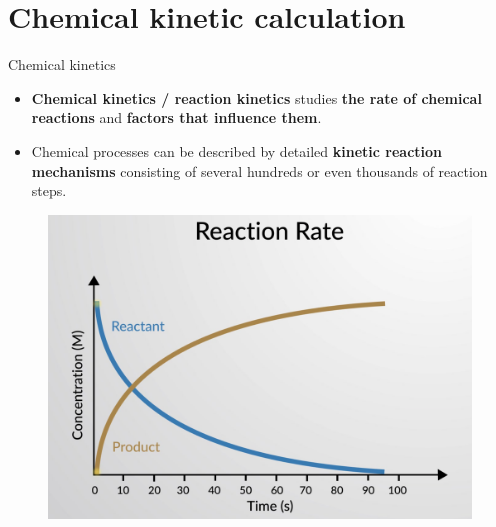 \section{Chemical kinetic calculation}
%
%
\begin{frame}{Chemical kinetics}
	
	\begin{itemize}
		\item \alert{\bf Chemical kinetics / reaction kinetics} studies \alert{\textbf{the rate of chemical reactions}} and \alert{\textbf{factors that influence them}}.
		\pause
		\item Chemical processes can be described by detailed \alert{\textbf{kinetic reaction mechanisms}} consisting of several hundreds or even thousands of reaction steps. 
	\end{itemize}

	\vskip 5pt
	\begin{figure}
		\centering
		\includegraphics[height=0.35\columnwidth]{figures/chemical-kinetics/chemical-kinetics-intro}
	\end{figure}
\end{frame}
%
%
